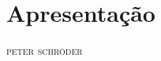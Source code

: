 
%
%
%
%
%
%
%
%
%
%
%
%
%
%
%
%
%
%
%
%
%
%
%

\chapter[Apresentação, \emph{por Peter Schröder}]{Apresentação }

\begin{flushright}
\textsc{peter schröder}\medskip
\end{flushright}

